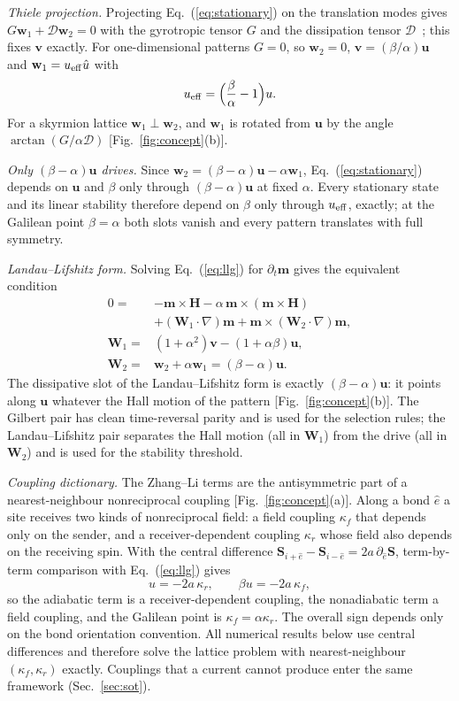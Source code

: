 \documentclass[prb,reprint,amsmath,amssymb,superscriptaddress,floatfix]{revtex4-2}
\newcommand{\ueff}{u_{\rm eff}}
\newcommand{\vm}{\mathbf m}
\newcommand{\vu}{\mathbf u}
\newcommand{\vv}{\mathbf v}
\newcommand{\wone}{\mathbf w_1}
\newcommand{\wtwo}{\mathbf w_2}
\newcommand{\Wtwo}{\mathbf W_2}
\newcommand{\Dm}{\mathcal D}
\begin{document}
\textit{Thiele projection.} Projecting Eq.~(\ref{eq:stationary}) on the translation modes gives $G\wone+\Dm\wtwo=0$ with the gyrotropic tensor $G$ and the dissipation tensor $\Dm$~\cite{Thiele1973}; this fixes $\vv$ exactly. For one-dimensional patterns $G=0$, so $\wtwo=0$, $\vv=(\beta/\alpha)\vu$ and $\wone=\ueff\hat u$ with
\begin{equation}
\ueff=\Big(\frac{\beta}{\alpha}-1\Big)u .
\label{eq:ueff}
\end{equation}
For a skyrmion lattice $\wone\perp\wtwo$, and $\wone$ is rotated from $\vu$ by the angle $\arctan(G/\alpha\Dm)$ [Fig.~\ref{fig:concept}(b)].

\textit{Only $(\beta-\alpha)\vu$ drives.} Since $\wtwo=(\beta-\alpha)\vu-\alpha\wone$, Eq.~(\ref{eq:stationary}) depends on $\vu$ and $\beta$ only through $(\beta-\alpha)\vu$ at fixed $\alpha$. Every stationary state and its linear stability therefore depend on $\beta$ only through $\ueff$, exactly; at the Galilean point $\beta=\alpha$ both slots vanish and every pattern translates with full symmetry.

\textit{Landau--Lifshitz form.} Solving Eq.~(\ref{eq:llg}) for $\partial_t\vm$ gives the equivalent condition
\begin{align}
0={}&-\vm\times\mathbf H-\alpha\,\vm\times(\vm\times\mathbf H)\nonumber\\
&+(\mathbf W_1\cdot\nabla)\vm+\vm\times(\Wtwo\cdot\nabla)\vm,\nonumber\\
\mathbf W_1={}&(1+\alpha^2)\vv-(1+\alpha\beta)\vu,\nonumber\\
\Wtwo={}&\wtwo+\alpha\wone=(\beta-\alpha)\vu .
\label{eq:LL}
\end{align}
The dissipative slot of the Landau--Lifshitz form is exactly $(\beta-\alpha)\vu$: it points along $\vu$ whatever the Hall motion of the pattern [Fig.~\ref{fig:concept}(b)]. The Gilbert pair has clean time-reversal parity and is used for the selection rules; the Landau--Lifshitz pair separates the Hall motion (all in $\mathbf W_1$) from the drive (all in $\Wtwo$) and is used for the stability threshold.

\textit{Coupling dictionary.} The Zhang--Li terms are the antisymmetric part of a nearest-neighbour nonreciprocal coupling [Fig.~\ref{fig:concept}(a)]. Along a bond $\hat e$ a site receives two kinds of nonreciprocal field: a field coupling $\kappa_f$ that depends only on the sender, and a receiver-dependent coupling $\kappa_r$ whose field also depends on the receiving spin. With the central difference $\mathbf S_{i+\hat e}-\mathbf S_{i-\hat e}=2a\,\partial_{\hat e}\mathbf S$, term-by-term comparison with Eq.~(\ref{eq:llg}) gives
\begin{equation}
u=-2a\,\kappa_r,\qquad \beta u=-2a\,\kappa_f,
\label{eq:dictionary}
\end{equation}
so the adiabatic term is a receiver-dependent coupling, the nonadiabatic term a field coupling, and the Galilean point is $\kappa_f=\alpha\kappa_r$. The overall sign depends only on the bond orientation convention. All numerical results below use central differences and therefore solve the lattice problem with nearest-neighbour $(\kappa_f,\kappa_r)$ exactly. Couplings that a current cannot produce enter the same framework (Sec.~\ref{sec:sot}).
\end{document}
